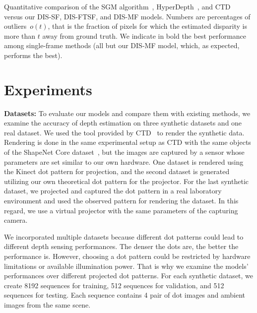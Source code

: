 \begin{table}[!t]
\begin{center}
\begin{threeparttable}
\begin{tablenotes}
        \end{tablenotes}
      \end{threeparttable}
    \end{center}
    \caption{Quantitative comparison of the SGM algorithm~\citep{hirschmuller2007stereo}, HyperDepth~\citep{ryan2016hyperdepth}, and CTD~\citep{riegler2019connecting} versus our DIS-SF, DIS-FTSF, and DIS-MF models. Numbers are percentages of outliers~$o(t)$, that is the fraction of pixels for which the estimated disparity is more than $t$ away from ground truth. We indicate in bold the best performance among single-frame methods (\ie all but our DIS-MF model, which, as expected, performs the best).}
    \label{table:c2_quantitative}
\end{table}

\section{Experiments}
\label{sec:c2_experiments}

\noindent\textbf{Datasets:} To evaluate our models and compare them with existing methods, we examine the accuracy of depth estimation on three synthetic datasets and one real dataset. We used the tool provided by CTD~\citep{riegler2019connecting} to render the synthetic data. Rendering is done in the same experimental setup as CTD with the same objects of the ShapeNet Core dataset~\citep{chang2015shapenet}, but the images are captured by a sensor whose parameters are set similar to our own hardware. One dataset is rendered using the Kinect dot pattern for projection, and the second dataset is generated utilizing our own theoretical dot pattern for the projector. For the last synthetic dataset, we projected and captured the dot pattern in a real laboratory environment and used the observed pattern for rendering the dataset. In this regard, we use a virtual projector with the same parameters of the capturing camera.

We incorporated multiple datasets because different dot patterns could lead to different depth sensing performances. The denser the dots are, the better the performance is. However, choosing a dot pattern could be restricted by hardware limitations or available illumination power. That is why we examine the models' performances over different projected dot patterns. For each synthetic dataset, we create 8192 sequences for training, 512 sequences for validation, and 512 sequences for testing. Each sequence contains 4 pair of dot images and ambient images from the same scene.

